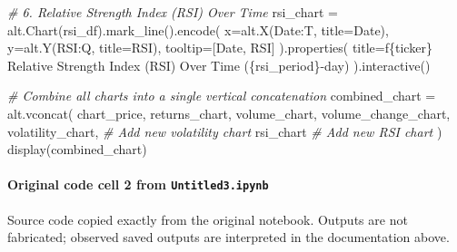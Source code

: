\documentclass[
  11pt,
]{article}
\newenvironment{Shaded}{}{}
\newcommand{\CommentTok}[1]{\textcolor[rgb]{0.38,0.63,0.69}{\textit{#1}}}
\newcommand{\NormalTok}[1]{#1}
\newcommand{\OperatorTok}[1]{\textcolor[rgb]{0.40,0.40,0.40}{#1}}
\newcommand{\SpecialCharTok}[1]{\textcolor[rgb]{0.25,0.44,0.63}{#1}}
\newcommand{\SpecialStringTok}[1]{\textcolor[rgb]{0.73,0.40,0.53}{#1}}
\newcommand{\StringTok}[1]{\textcolor[rgb]{0.25,0.44,0.63}{#1}}
\begin{document}
\begin{Shaded}
\begin{Highlighting}[]
\CommentTok{\# 6. Relative Strength Index (RSI) Over Time}
\NormalTok{rsi\_chart }\OperatorTok{=}\NormalTok{ alt.Chart(rsi\_df).mark\_line().encode(}
\NormalTok{    x}\OperatorTok{=}\NormalTok{alt.X(}\StringTok{\textquotesingle{}Date:T\textquotesingle{}}\NormalTok{, title}\OperatorTok{=}\StringTok{\textquotesingle{}Date\textquotesingle{}}\NormalTok{),}
\NormalTok{    y}\OperatorTok{=}\NormalTok{alt.Y(}\StringTok{\textquotesingle{}RSI:Q\textquotesingle{}}\NormalTok{, title}\OperatorTok{=}\StringTok{\textquotesingle{}RSI\textquotesingle{}}\NormalTok{),}
\NormalTok{    tooltip}\OperatorTok{=}\NormalTok{[}\StringTok{\textquotesingle{}Date\textquotesingle{}}\NormalTok{, }\StringTok{\textquotesingle{}RSI\textquotesingle{}}\NormalTok{]}
\NormalTok{).properties(}
\NormalTok{    title}\OperatorTok{=}\SpecialStringTok{f\textquotesingle{}}\SpecialCharTok{\{}\NormalTok{ticker}\SpecialCharTok{\}}\SpecialStringTok{ Relative Strength Index (RSI) Over Time (}\SpecialCharTok{\{}\NormalTok{rsi\_period}\SpecialCharTok{\}}\SpecialStringTok{{-}day)\textquotesingle{}}
\NormalTok{).interactive()}

\CommentTok{\# Combine all charts into a single vertical concatenation}
\NormalTok{combined\_chart }\OperatorTok{=}\NormalTok{ alt.vconcat(}
\NormalTok{    chart\_price,}
\NormalTok{    returns\_chart,}
\NormalTok{    volume\_chart,}
\NormalTok{    volume\_change\_chart,}
\NormalTok{    volatility\_chart, }\CommentTok{\# Add new volatility chart}
\NormalTok{    rsi\_chart         }\CommentTok{\# Add new RSI chart}
\NormalTok{)}
\NormalTok{display(combined\_chart)}
\end{Highlighting}
\end{Shaded}

\paragraph{\texorpdfstring{Original code cell 2 from \texttt{Untitled3.ipynb}}{Original code cell 2 from Untitled3.ipynb}}\label{original-code-cell-2-from-untitled3ipynb}

Source code copied exactly from the original notebook. Outputs are not fabricated; observed saved outputs are interpreted in the documentation above.
\end{document}
